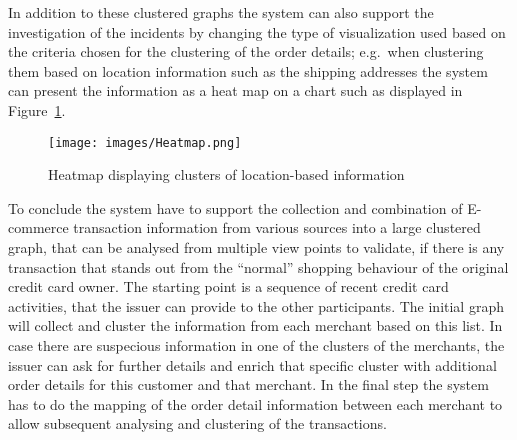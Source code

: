  In addition to these clustered graphs the system can also support the investigation of the incidents by changing the type of visualization used based on the criteria chosen for the clustering of the order details; e.g.\ when clustering them based on location information such as the shipping addresses the system can present the information as a heat map on a chart such as displayed in Figure~\ref{fig:images_map_heatmap}. \@

\begin{figure}[H]
  \centering
  \texttt{[image: images/Heatmap.png]}
  \caption{Heatmap displaying clusters of location-based information}
\label{fig:images_map_heatmap}
\end{figure}

To conclude the system have to support the collection and combination of \gls{E-commerce} transaction information from various sources into a large clustered graph, that can be analysed from multiple view points to validate, if there is any transaction that stands out from the ``normal'' shopping behaviour of the original credit card owner. The starting point is a sequence of recent credit card activities, that the issuer can provide to the other participants. The initial graph will collect and cluster the information from each merchant based on this list. In case there are suspecious information in one of the clusters of the merchants, the issuer can ask for further details and enrich that specific cluster with additional order details for this customer and that merchant. In the final step the system has to do the mapping of the order detail information between each merchant to allow subsequent analysing and clustering of the transactions.

